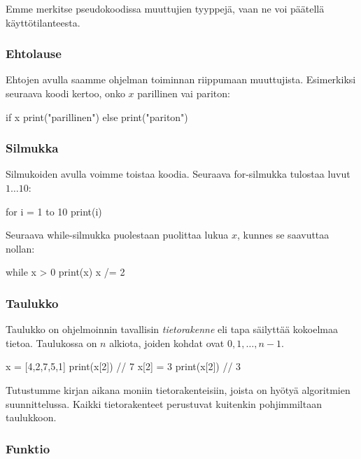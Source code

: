 Emme merkitse pseudokoodissa muuttujien tyyppejä,
vaan ne voi päätellä käyttötilanteesta.

\subsubsection{Ehtolause}

Ehtojen avulla saamme ohjelman toiminnan
riippumaan muuttujista.
Esimerkiksi seuraava koodi kertoo, onko $x$ parillinen vai pariton:

\begin{code}
if x%
    print("parillinen")
else
    print("pariton")
\end{code}

\subsubsection{Silmukka}

Silmukoiden avulla voimme toistaa koodia.
Seuraava for-silmukka tulostaa luvut $1 \dots 10$:

\begin{code}
for i = 1 to 10
    print(i)
\end{code}

Seuraava while-silmukka puolestaan puolittaa lukua $x$,
kunnes se saavuttaa nollan:

\begin{code}
while x > 0
    print(x)
    x /= 2
\end{code}

\subsubsection{Taulukko}


Taulukko on ohjelmoinnin tavallisin \emph{tietorakenne}
eli tapa säilyttää kokoelmaa tietoa.
Taulukossa on $n$ alkiota, joiden kohdat ovat $0,1,\dots,n-1$.

\begin{code}
x = [4,2,7,5,1]
print(x[2]) // 7
x[2] = 3
print(x[2]) // 3
\end{code}

Tutustumme kirjan aikana moniin tietorakenteisiin,
joista on hyötyä algoritmien suunnittelussa.
Kaikki tietorakenteet perustuvat kuitenkin pohjimmiltaan taulukkoon.

\subsubsection{Funktio}

